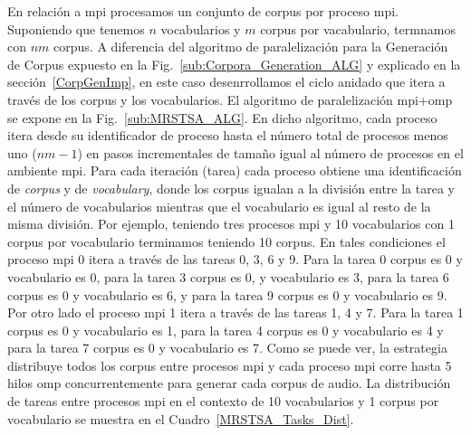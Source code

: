 {En relación a \gls{mpi} procesamos un conjunto de corpus por proceso \gls{mpi}.
Suponiendo que tenemos $n$ vocabularios y $m$ corpus por vacabulario, termnamos con $n m$ corpus.
A diferencia del algoritmo de paralelización para la Generación de Corpus expuesto en la Fig.~\ref{sub:Corpora_Generation_ALG} y explicado en la sección~\ref{CorpGenImp}, en este caso desenrrollamos el ciclo anidado que itera a través de los corpus y los vocabularios.
El algoritmo de paralelización \gls{mpi}+\gls{omp} se expone en la Fig.~\ref{sub:MRSTSA_ALG}.
En dicho algoritmo, cada proceso itera desde su identificador de proceso hasta el número total de procesos menos uno ($n m - 1$) en pasos incrementales de tamaño igual al número de procesos en el ambiente \gls{mpi}.
Para cada iteración (tarea) cada proceso obtiene una identificación de \emph{corpus} y de \emph{vocabulary}, donde los corpus igualan a la división entre la tarea y el número de vocabularios mientras que el vocabulario es igual al resto de la misma división.
Por ejemplo, teniendo tres procesos \gls{mpi} y 10 vocabularios con 1 corpus por vocabulario terminamos teniendo 10 corpus.
En tales condiciones el proceso \gls{mpi} 0 itera a través de las tareas 0, 3, 6 y 9.
Para la tarea 0 corpus es 0 y vocabulario es 0, para la tarea 3 corpus es 0, y vocabulario es 3, para la tarea 6 corpus es 0 y vocabulario es 6, y para la tarea 9 corpus es 0 y vocabulario es 9.
Por otro lado el proceso \gls{mpi} 1 itera a través de las tareas 1, 4 y 7.
Para la tarea 1 corpus es 0 y vocabulario es 1, para la tarea 4 corpus es 0 y vocabulario es 4 y para la tarea 7 corpus es 0 y vocabulario es 7.
Como se puede ver, la estrategia distribuye todos los corpus entre procesos \gls{mpi} y cada proceso \gls{mpi} corre hasta 5 hilos \gls{omp} concurrentemente para generar cada corpus de audio.
La distribución de tareas entre procesos \gls{mpi} en el contexto de 10 vocabularios y 1 corpus por vocabulario se muestra en el Cuadro~\ref{MRSTSA_Tasks_Dist}.

}
